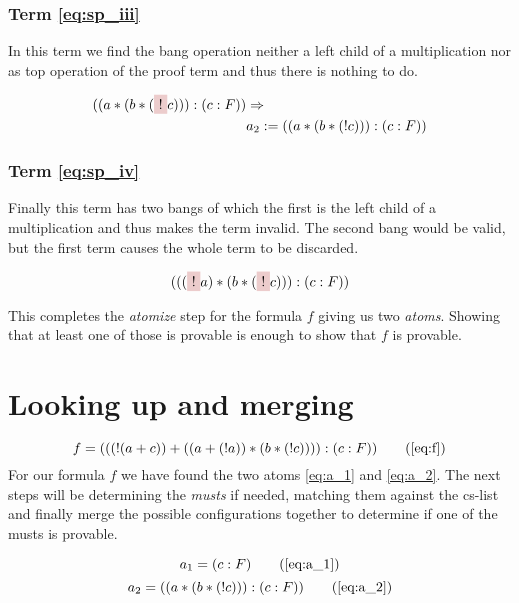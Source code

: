 \subsubsection[third term]{Term \ref{eq:sp_iii}}
In this term we find the bang operation neither a left child of a multiplication nor as top operation of the proof term and thus there is nothing to do.

\begin{equation}\label{eq:a_2}
	\begin{split}
	((a *(b* (\tikz[baseline]{\node[fill=red!20,anchor=base] (t1){$!$};} c))):(c:F))	 & \Rightarrow \\
	& a_2 := ((a *(b* (! c))):(c:F))
	\end{split}
\end{equation}

\subsubsection[Fourths term]{Term \ref{eq:sp_iv}}
Finally this term has two bangs of which the first is the left child of a multiplication and thus makes the term invalid. The second bang would be valid, but the first term causes the whole term to be discarded.

\begin{equation*}
	(((
	\tikz[baseline]{\node[fill=red!20,anchor=base] (t1){$!$};} a)*(b* (
	\tikz[baseline]{\node[fill=red!20,anchor=base] (t1){$!$};} c))):(c:F))
\end{equation*}

\bigskip
This completes the \emph{atomize} step for the formula $f$ giving us two \emph{atoms}. Showing that at least one of those is provable is enough to show that $f$ is provable. 

\section{Looking up and merging}

\begin{equation*}
		f = (((!(a+c))+((a+(!a))*(b*(!c)))):(c:F)) 
		\tag{\ref{eq:f}}  
\end{equation*}
For our formula $f$ we have found the two atoms \ref{eq:a_1} and \ref{eq:a_2}. The next steps will be determining the \emph{musts} if needed, matching them against the cs-list and finally merge the possible configurations together to determine if one of the musts is provable.


\begin{equation*}
		a_1 = (c:F) 
		\tag{\ref{eq:a_1}}
\end{equation*}
\begin{equation*}		
		a_2 = ((a *(b* (! c))):(c:F)) 
		\tag{\ref{eq:a_2}}
\end{equation*}

